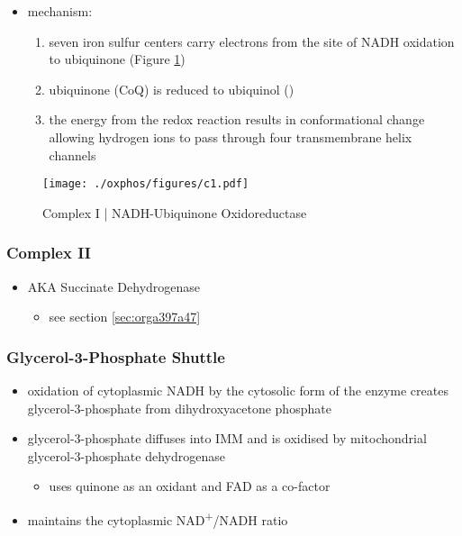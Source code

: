 \documentclass[12pt]{scrartcl}
\begin{document}
{\small{}}

\begin{itemize}
\item mechanism: 
\begin{enumerate}
\item seven iron sulfur centers carry electrons from the site of NADH
oxidation to ubiquinone (Figure \ref{fig:org2fc79c7})
\item ubiquinone (CoQ) is reduced to ubiquinol ()
\item the energy from the redox reaction results in conformational
change allowing hydrogen ions to pass through four transmembrane
helix channels
\end{enumerate}
\end{itemize}

\begin{figure}[htbp]
\centering
\texttt{[image: ./oxphos/figures/c1.pdf]}
\caption[c1]{\label{fig:org2fc79c7}Complex I | NADH-Ubiquinone Oxidoreductase}
\end{figure}

\subsubsection{Complex II}
\label{sec:org0b3e4d2}
\begin{itemize}
\item AKA Succinate Dehydrogenase 
\begin{itemize}
\item see section \ref{sec:orga397a47}
\end{itemize}
\end{itemize}

\subsubsection{Glycerol-3-Phosphate Shuttle}
\label{sec:orgb2e815d}
\begin{itemize}
\item oxidation of cytoplasmic NADH by the cytosolic form of the enzyme
creates glycerol-3-phosphate from dihydroxyacetone phosphate
\item glycerol-3-phosphate diffuses into IMM and is oxidised by mitochondrial glycerol-3-phosphate dehydrogenase
\begin{itemize}
\item uses quinone as an oxidant and FAD as a co-factor
\end{itemize}
\item maintains the cytoplasmic NAD\textsuperscript{+}/NADH ratio
\end{itemize}
\end{document}
